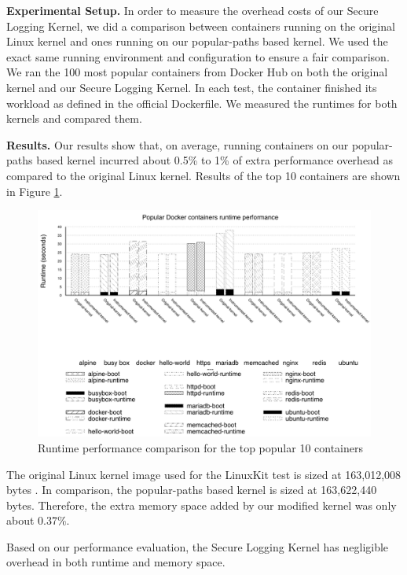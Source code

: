 \textbf{Experimental Setup.}
In order to measure the overhead costs of our Secure Logging Kernel, 
we did a comparison between containers running on the original Linux kernel and ones running on our popular-paths based kernel. 
We used the exact same running environment and configuration to ensure a fair comparison. 
We ran the 100 most popular containers from Docker Hub on both the original kernel and our Secure Logging Kernel. 
In each test, the container finished its workload as defined in the official Dockerfile. We measured the runtimes for both kernels and compared them. 

\textbf{Results.}
Our results show that, on average, running containers on our popular-paths based kernel incurred about 0.5\% to 1\% of extra performance overhead as compared to the original Linux kernel. Results of the top 10 containers are shown in Figure \ref{fig:performance}.

\begin{figure}
\centering
\includegraphics[width=1.5\columnwidth]{diagram/performance.png}
\caption{\small Runtime performance comparison for the top popular 10 containers}
\label{fig:performance}
\end{figure}

The original Linux kernel image used for the  LinuxKit test  is sized at 163,012,008 bytes . 
In comparison, the popular-paths based kernel is sized at 163,622,440 bytes. Therefore, the extra memory space added by our modified kernel was only about 0.37\%. 

Based on our performance evaluation, the Secure Logging Kernel has negligible overhead in both runtime and memory space. 